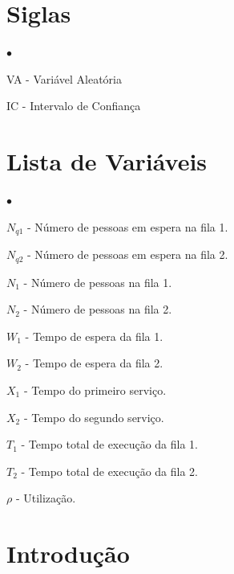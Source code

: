 \documentclass[a4paper,12pt]{report}
\begin{document}




\chapter*{Siglas}
\begin{list}{$\bullet$}{}
  \item[VA] - Variável Aleatória
  \item[IC] - Intervalo de Confiança
\end{list}

\chapter*{Lista de Variáveis}
\begin{list}{$\bullet$}{}
  \item[$N_{q1}$] - Número de pessoas em espera na fila 1.
  \item[$N_{q2}$] - Número de pessoas em espera na fila 2.
  \item[$N_1$] - Número de pessoas na fila 1.
  \item[$N_2$] - Número de pessoas na fila 2.
  \item[$W_1$] - Tempo de espera da fila 1.
  \item[$W_2$] - Tempo de espera da fila 2.
  \item[$X_1$] - Tempo do primeiro serviço.
  \item[$X_2$] - Tempo do segundo serviço.
  \item[$T_1$] - Tempo total de execução da fila 1.
  \item[$T_2$] - Tempo total de execução da fila 2.
  \item[$\rho$] - Utilização.
\end{list}

\tableofcontents

\listoffigures

\listoftables

\chapter{Introdução}
\end{document}
